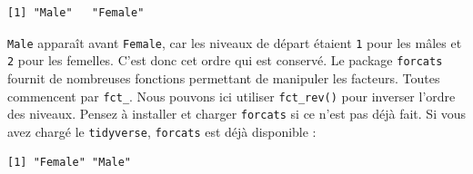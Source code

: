 \documentclass[
  a4paper,
]{article}
\newenvironment{Shaded}{\begin{snugshade}}{\end{snugshade}}
\newcommand{\DataTypeTok}[1]{\textcolor[rgb]{0.00,0.34,0.68}{#1}}
\newcommand{\KeywordTok}[1]{\textcolor[rgb]{0.12,0.11,0.11}{\textbf{#1}}}
\newcommand{\NormalTok}[1]{\textcolor[rgb]{0.12,0.11,0.11}{#1}}
\newcommand{\OperatorTok}[1]{\textcolor[rgb]{0.12,0.11,0.11}{#1}}
\newcommand{\OtherTok}[1]{\textcolor[rgb]{0.00,0.43,0.16}{#1}}
\newcommand{\StringTok}[1]{\textcolor[rgb]{0.75,0.01,0.01}{#1}}
\begin{document}
\begin{verbatim}
[1] "Male"   "Female"
\end{verbatim}

\texttt{Male} apparaît avant \texttt{Female}, car les niveaux de départ étaient \texttt{1} pour les mâles et \texttt{2} pour les femelles. C'est donc cet ordre qui est conservé. Le package \texttt{forcats} fournit de nombreuses fonctions permettant de manipuler les facteurs. Toutes commencent par \texttt{fct\_}. Nous pouvons ici utiliser \texttt{fct\_rev()} pour inverser l'ordre des niveaux. Pensez à installer et charger \texttt{forcats} si ce n'est pas déjà fait. Si vous avez chargé le \texttt{tidyverse}, \texttt{forcats} est déjà disponible :

\begin{Shaded}
\end{Shaded}

\begin{verbatim}
[1] "Female" "Male"  
\end{verbatim}

\begin{Shaded}
\end{Shaded}
\end{document}
